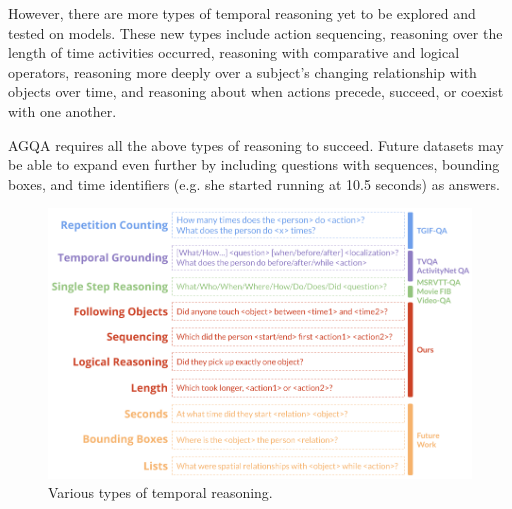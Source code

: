 \documentclass[10pt,twocolumn,letterpaper]{article}
\newcommand{\mgm}[1]{{\color{cyan}{mgm: #1}}}
\begin{document}
However, there are more types of temporal reasoning yet to be explored and tested on models. These new types include action sequencing, reasoning over the length of time activities occurred, reasoning with comparative and logical operators, reasoning more deeply over a subject's changing relationship with objects over time, and reasoning about when actions precede, succeed, or coexist with one another.  \mgm{re-address this list}


 
AGQA requires all the above types of reasoning to succeed. \mgm{can I back that up?} Future datasets may be able to expand even further by including questions with sequences, bounding boxes, and time identifiers (e.g. she started running at 10.5 seconds) as answers. \mgm{keep this in conclusion?}

\begin{figure}[t]
\begin{center}
\includegraphics[width=0.8\linewidth]{Figures/figure_temporalTypes.png}
\end{center}
   \caption{Various types of temporal reasoning.}
\label{temporal_types}
\end{figure}
\end{document}

